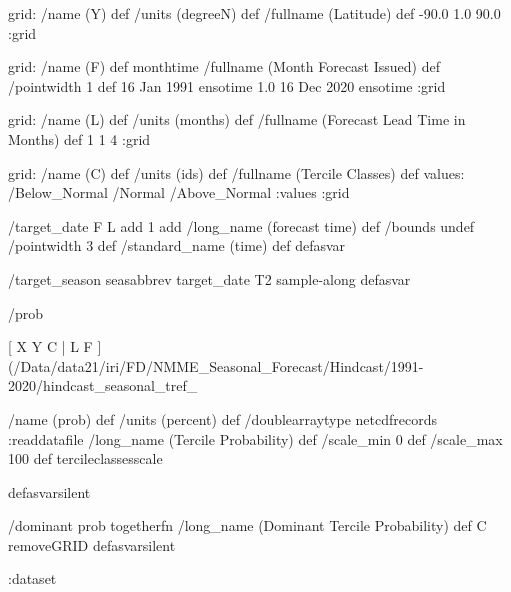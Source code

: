 \begin{ingrid}
grid:
/name (Y) def
/units (degreeN) def
/fullname (Latitude) def
-90.0 1.0 90.0
:grid

grid:
/name (F) def
monthtime
/fullname (Month Forecast Issued) def
/pointwidth 1 def
16 Jan 1991 ensotime
1.0
16 Dec 2020 ensotime
:grid

grid:
/name (L) def
/units (months) def
/fullname (Forecast Lead Time in Months) def
1 1 4
:grid

grid:
/name (C) def
/units (ids) def
/fullname (Tercile Classes) def
values: /Below_Normal /Normal /Above_Normal :values
:grid

/target_date { F L add 1 add /long_name (forecast time) def /bounds undef /pointwidth 3 def /standard_name (time) def } defasvar

/target_season { seasabbrev target_date T2 sample-along } defasvar

/prob {

[ X Y C | L F ] (/Data/data21/iri/FD/NMME_Seasonal_Forecast/Hindcast/1991-2020/hindcast_seasonal_tref_%

/name (prob) def
/units (percent) def
/doublearraytype netcdfrecords :readdatafile
/long_name (Tercile Probability) def
/scale_min 0 def
/scale_max 100 def
tercileclassesscale
} defasvarsilent

/dominant {
prob togetherfn
/long_name (Dominant Tercile Probability) def
C removeGRID
} defasvarsilent

:dataset
\end{ingrid}
